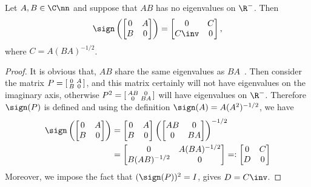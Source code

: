 \begin{theorem} \label{thm.coupled-sign}
Let $A,B\in\C\nn$ and suppose that $AB$ has no eigenvalues on $\R^{-}$.
Then
\begin{equation}\notag
  \sign \left(
  \begin{bmatrix}
    0 & A \\ B & 0
  \end{bmatrix}
  \right) =
  \begin{bmatrix}
    0 & C \\ C\inv & 0 
  \end{bmatrix},
\end{equation}
where $C = A(BA)^{-1/2}$.
\end{theorem}

\begin{proof}
It is obvious that, $AB$ share the same eigenvalues as $BA$~. Then consider the matrix
$P = \begin{bsmallmatrix} 0 & A \\ B & 0 \end{bsmallmatrix}$, and this
matrix certainly will not have eigenvalues on the imaginary axis, otherwise
$P^{2} = \begin{bsmallmatrix} AB & 0 \\ 0 & BA \end{bsmallmatrix}$ will
have eigenvalues on $\R^{-}$. Therefore $\sign(P)$ is defined and using the
definition $\sign(A) = A(A^{2})^{-1/2}$, we have
\begin{align}\notag
  \sign \left(
  \begin{bmatrix}
    0 & A \\ B & 0
  \end{bmatrix}
  \right)
  & =
    \begin{bmatrix}
      0 & A \\ B & 0
    \end{bmatrix}
    \left(
    \begin{bmatrix} AB & 0 \\ 0 & BA \end{bmatrix} 
    \right)^{-1/2}\\
      & =
        \begin{bmatrix}
          0 & A(BA)^{-1/2} \\ B(AB)^{-1/2} & 0
        \end{bmatrix}
        =:
        \begin{bmatrix}
          0 & C \\ D & 0
        \end{bmatrix}
\end{align}
Moreover, we impose the fact that $(\sign(P))^{2} = I$, gives $D = C\inv$.
\end{proof}

